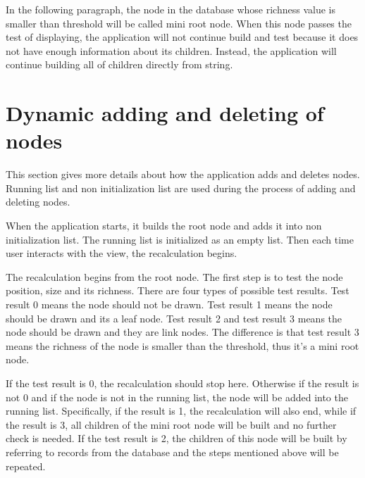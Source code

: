 \documentclass[a4paper,11pt,twoside]{report}
\begin{document}
In the following paragraph, the node in the database whose richness value is smaller than threshold will be called mini root node. When this node passes the test of displaying, the application will not continue build and test because it does not have enough information about its children. Instead, the application will continue building all of children directly from string. 

\section{Dynamic adding and deleting of nodes}

This section gives more details about how the application adds and deletes nodes. Running list and non initialization list are used during the process of adding and deleting nodes.

When the application starts, it builds the root node and adds it into non initialization list. The running list is initialized as an empty list. Then each time user interacts with the view, the recalculation begins.

The recalculation begins from the root node. The first step is to test the node position, size and its richness. There are four types of possible test results. Test result 0 means the node should not be drawn. Test result 1 means the node should be drawn and its a leaf node. Test result 2 and test result 3 means the node should be drawn and they are link nodes. The difference is that test result 3 means the richness of the node is smaller than the threshold, thus it's a mini root node. 

If the test result is 0, the recalculation should stop here. Otherwise if the result is not 0 and if the node is not in the running list, the node will be added into the running list. Specifically, if the result is 1, the recalculation will also end, while if the result is 3, all children of the mini root node will be built and no further check is needed. If the test result is 2, the children of this node will be built by referring to records from the database and the steps mentioned above will be repeated.
\end{document}
